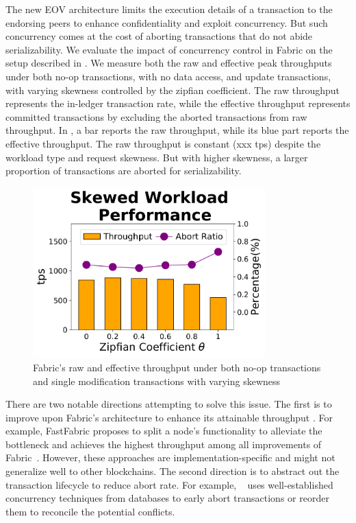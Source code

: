 The new EOV architecture limits the execution details of a transaction to the
endorsing peers to enhance confidentiality and exploit concurrency. But such
concurrency comes at the cost of aborting transactions that do not abide
serializability.
%
We evaluate the impact of concurrency control in Fabric on the setup described in .
%
We measure both the raw and effective peak throughputs under both no-op transactions, with no data access, and update transactions, with varying skewness controlled by the zipfian coefficient. 
%
The raw throughput represents the in-ledger transaction rate, while the effective throughput represents committed transactions by excluding the aborted transactions from raw throughput. 
%
In , a bar reports the raw throughput, while its blue part reports the effective throughput. 
%
The raw throughput is constant (xxx tps) despite the workload type and request skewness. 
%
But with higher skewness, a larger proportion of transactions are aborted for serializability.

\begin{figure}
  \centering     
  \includegraphics[width=0.8\textwidth]{chart/intro/skew.pdf}
  \caption{Fabric's raw and effective throughput under both no-op transactions and single modification transactions with varying skewness}
  \label{chart:txn:intro}
\end{figure}

There are two notable directions attempting to solve this issue.
%
The first is to improve upon Fabric's architecture to enhance its
attainable throughput \cite{nasir2018performance, thakkar2018performance}.
%
For example, FastFabric proposes to split a node's functionality to alleviate the bottleneck and achieves the highest throughput among all improvements of Fabric~\cite{gorenflo2019fastfabric}. 
%
However, these approaches are implementation-specific and might not generalize well
to other blockchains.
%
The second direction is to abstract out the transaction lifecycle to reduce
abort rate.
%
For example, {\fabricPlusplus}~\cite{sharma2019blurring} uses
well-established concurrency techniques from databases to early abort
transactions or reorder them to reconcile the potential conflicts.

